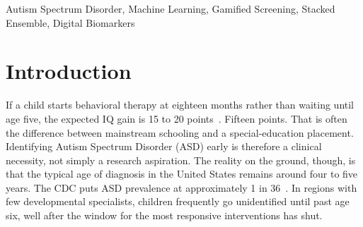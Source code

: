\documentclass[conference]{IEEEtran}
\begin{document}
\begin{abstract}
ASD screening puts families in a bind. Parent questionnaires (M-CHAT-R, AQ-10) take minutes to fill out, but they lean on caregiver memory, which makes them unreliable. Clinician-led observation with ADOS-2 gives far better results. The catch is access: wait times exceed six months in many regions. \textbf{NeuroStep} sits between these two paths. Children aged 4 to 8 play seven short browser games, two minutes each at the most, on any device that has a webcam. While the child plays, the platform silently captures tap timing, pause length, gaze direction, blink counts, and facial expression data. A \textit{hierarchical stacked ensemble} processes these signals in two tiers. Tier one consists of game-specific classifiers: Random Forest for the attention and emotion games, Logistic Regression for sequencing and visual discrimination tasks. Each classifier uses its own subset of AQ-10 features. Tier two is a Logistic Regression meta-learner that takes the seven game-level risk scores together with four demographic inputs (age, sex, jaundice history, family ASD presence) and computes one probability. MediaPipe Face Mesh and face-api.js handle all vision work on the client side; video never leaves the device. Testing on 5,519 merged AQ-10 records yielded \textbf{91.85\%} accuracy, \textbf{85.19\%} precision, \textbf{88.72\%} recall, and \textbf{0.8692} F1. The only hardware needed is a laptop with an ordinary webcam.
\end{abstract}

\begin{IEEEkeywords}
Autism Spectrum Disorder, Machine Learning, Gamified Screening, Stacked Ensemble, Digital Biomarkers
\end{IEEEkeywords}

\section{Introduction}
If a child starts behavioral therapy at eighteen months rather than waiting until age five, the expected IQ gain is 15 to 20 points~\cite{lord2018autism}. Fifteen points. That is often the difference between mainstream schooling and a special-education placement. Identifying Autism Spectrum Disorder (ASD) early is therefore a clinical necessity, not simply a research aspiration. The reality on the ground, though, is that the typical age of diagnosis in the United States remains around four to five years. The CDC puts ASD prevalence at approximately 1 in 36~\cite{maenner2023prevalence, zwaigenbaum2015early}. In regions with few developmental specialists, children frequently go unidentified until past age six, well after the window for the most responsive interventions has shut.
\end{document}
